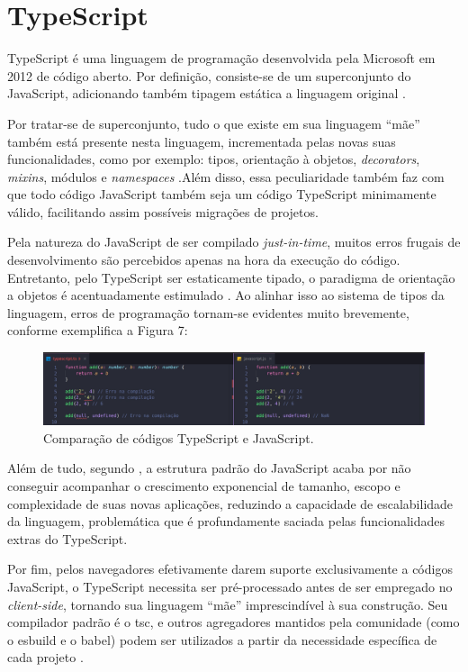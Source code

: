 \section{TypeScript}
\label{sec:typescript}
TypeScript é uma linguagem de programação desenvolvida pela Microsoft em 2012 de código aberto. Por definição, consiste-se de um superconjunto do JavaScript, adicionando também tipagem estática a linguagem original \cite{Microsoft2023}.

Por tratar-se de superconjunto, tudo o que existe em sua linguagem “mãe” também está presente nesta linguagem, incrementada pelas novas suas funcionalidades, como por exemplo: tipos, orientação à objetos, \textit{decorators}, \textit{mixins}, módulos e \textit{namespaces} \cite{Goldberg2022}.Além disso, essa peculiaridade também faz com que todo código JavaScript também seja um código TypeScript minimamente válido, facilitando assim possíveis migrações de projetos.

Pela natureza do JavaScript de ser compilado \textit{just-in-time}, muitos erros frugais de desenvolvimento são percebidos apenas na hora da execução do código. Entretanto, pelo TypeScript ser estaticamente tipado, o paradigma de orientação a objetos é acentuadamente estimulado \cite{Goldberg2022}. Ao alinhar isso ao sistema de tipos da linguagem, erros de programação tornam-se evidentes muito brevemente, conforme exemplifica a Figura 7:

\begin{figure}[H]
    \centering
    \caption{Comparação de códigos TypeScript e JavaScript.}
    \label{fig:typescript}
    \includegraphics[width=1\textwidth]{data/figures/typescript-javascript.jpg}
\end{figure}

Além de tudo, segundo , a estrutura padrão do JavaScript acaba por não conseguir acompanhar o crescimento exponencial de tamanho, escopo e complexidade de suas novas aplicações, reduzindo a capacidade de escalabilidade da linguagem, problemática que é profundamente saciada pelas funcionalidades extras do TypeScript.

Por fim, pelos navegadores efetivamente darem suporte exclusivamente a códigos JavaScript, o TypeScript necessita ser pré-processado antes de ser empregado no \textit{client-side}, tornando sua linguagem “mãe” imprescindível à sua construção. Seu compilador padrão é o tsc, e outros agregadores mantidos pela comunidade (como o esbuild e o babel) podem ser utilizados a partir da necessidade específica de cada projeto \cite{Microsoft2023a}.

